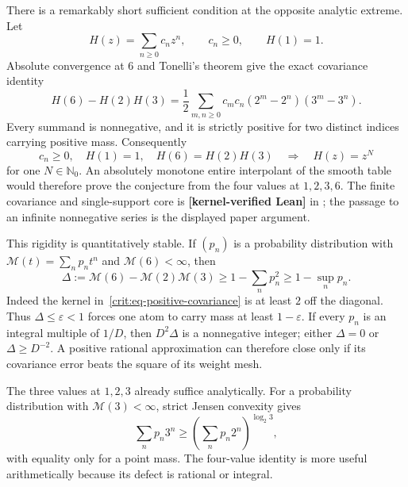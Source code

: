 \documentclass[11pt,oneside]{article}
\theoremstyle{definition}
\theoremstyle{remark}
\newcommand{\Nzero}{\mathbb N_0}
\newcommand{\lean}[1]{\texttt{\detokenize{#1}}}
\newcommand{\statuslean}{\textcolor{leanblue}{\textbf{[kernel-verified Lean]}}}
\begin{document}
There is a remarkably short sufficient condition at the opposite analytic extreme.  Let
\[
 H(z)=\sum_{n\ge0}c_nz^n,
 \qquad c_n\ge0,
 \qquad H(1)=1.
\]
Absolute convergence at $6$ and Tonelli's theorem give the exact covariance identity
\begin{equation}
 H(6)-H(2)H(3)
 =\frac12\sum_{m,n\ge0}c_mc_n
   (2^m-2^n)(3^m-3^n).
 \label{crit:eq-positive-covariance}
\end{equation}
Every summand is nonnegative, and it is strictly positive for two distinct indices carrying
positive mass.  Consequently
\begin{equation}
 c_n\ge0,\quad H(1)=1,\quad H(6)=H(2)H(3)
 \quad\Longrightarrow\quad H(z)=z^N
 \label{crit:eq-positive-closure}
\end{equation}
for one $N\in\Nzero$.  An absolutely monotone entire interpolant of the smooth table would
therefore prove the conjecture from the four values at $1,2,3,6$.  The finite covariance and
single-support core is \statuslean{} in \lean{PositiveCoefficientClosure}; the passage to an
infinite nonnegative series is the displayed paper argument.

This rigidity is quantitatively stable.  If $(p_n)$ is a probability distribution with
$\mathcal M(t)=\sum_np_nt^n$ and $\mathcal M(6)<\infty$, then
\begin{equation}
 \Delta:=\mathcal M(6)-\mathcal M(2)\mathcal M(3)
 \ge1-\sum_np_n^2\ge1-\sup_np_n.
 \label{crit:eq-positive-concentration}
\end{equation}
Indeed the kernel in~\eqref{crit:eq-positive-covariance} is at least $2$ off the diagonal.
Thus $\Delta\le\varepsilon<1$ forces one atom to carry mass at least $1-\varepsilon$.
If every $p_n$ is an integral multiple of $1/D$, then $D^2\Delta$ is a nonnegative integer;
either $\Delta=0$ or $\Delta\ge D^{-2}$.  A positive rational approximation can therefore
close only if its covariance error beats the square of its weight mesh.

The three values at $1,2,3$ already suffice analytically.  For a probability distribution
with $\mathcal M(3)<\infty$, strict Jensen convexity gives
\begin{equation}
 \sum_np_n3^n\ge\left(\sum_np_n2^n\right)^{\log_2 3},
 \label{crit:eq-discrete-jensen}
\end{equation}
with equality only for a point mass.  The four-value identity is more useful arithmetically
because its defect is rational or integral.
\end{document}
